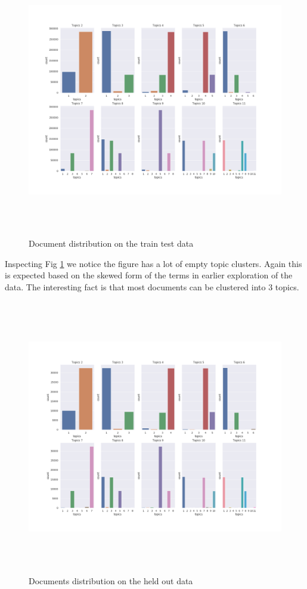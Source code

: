 \begin{figure}[h]
    \centering
    \includegraphics[width=16cm, height=12cm]{figures/doc_distr/doc_distribution_1-11_corpus.png}
    \caption{Document distribution on the train test data}
    \label{fig:doc_distr_1-11corpus}
\end{figure}

Inspecting Fig \ref{fig:doc_distr_1-11corpus} we notice the figure has a lot of empty topic clusters. Again this is expected based on the skewed form of the terms in earlier exploration of the data. The interesting fact is that most documents can be clustered into 3 topics. 

\begin{figure}[h]
    \centering
    \includegraphics[width=16cm, height=12cm]{figures/doc_distr/doc_distribution_1-11.png}
    \caption{Documents distribution on the held out data}
    \label{fig:doc_distr_1-11held_out}
\end{figure}


